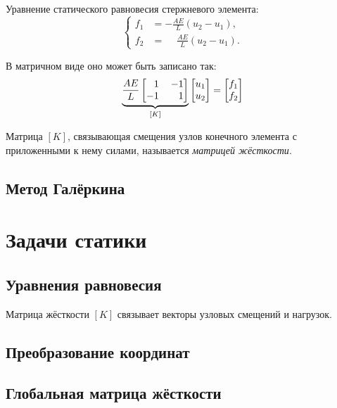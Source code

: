 \documentclass[10pt]{article}
\numberwithin{equation}{section}
\newcommand{\neword}{\emph}
\newcommand{\matr}[1]{[#1]}
\newcommand{\mm}{\llap{$-$}}
\newcommand{\phm}{\phantom{-}}
\begin{document}
Уравнение статического равновесия стержневого элемента:
\begin{equation}
  \begin{cases}
    f_1 &= -\frac{AE}{L}(u_2-u_1),\\
    f_2 &= \phm\frac{AE}{L}(u_2-u_1).
  \end{cases}
\end{equation}

В матричном виде оно может быть записано так:
\begin{equation}
  \label{eq:bar-equil}
  \underbrace{
  \frac{AE}{L}
  \begin{bmatrix}
    \phm{}1 && \mm1\\
    -1 && 1
  \end{bmatrix}}_{\matr{K}}
  \begin{bmatrix}
    u_1\\
    u_2
  \end{bmatrix}
  =
  \begin{bmatrix}
    f_1\\
    f_2
  \end{bmatrix}
\end{equation}

Матрица $\matr{K}$, связывающая смещения узлов конечного элемента с
приложенными к нему силами, называется \neword{матрицей жёсткости}.

\subsection{Метод Галёркина}

\section{Задачи статики}

\subsection{Уравнения равновесия}

Матрица жёсткости $\matr{K}$ связывает векторы узловых смещений и
нагрузок.

\subsection{Преобразование координат}

\subsection{Глобальная матрица жёсткости}
\end{document}
